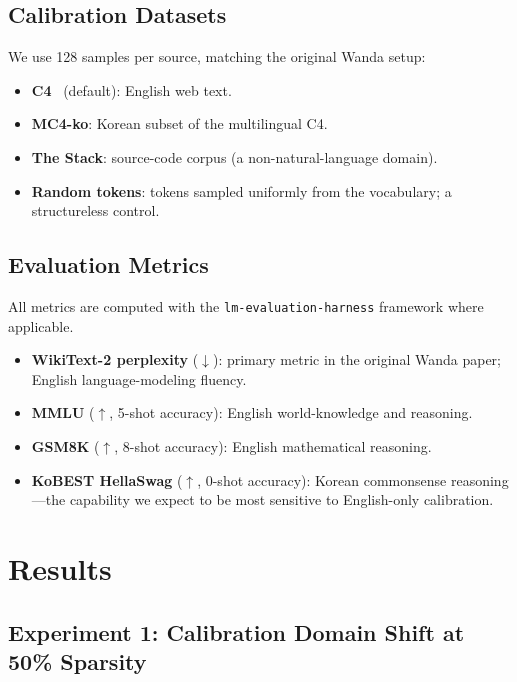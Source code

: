 \documentclass{article}
\begin{document}
\subsection{Calibration Datasets}

We use 128 samples per source, matching the original Wanda setup:
\begin{itemize}
  \item \textbf{C4}~\cite{c4} (default): English web text.
  \item \textbf{MC4-ko}: Korean subset of the multilingual C4.
  \item \textbf{The Stack}: source-code corpus (a non-natural-language domain).
  \item \textbf{Random tokens}: tokens sampled uniformly from the vocabulary;
        a structureless control.
\end{itemize}

\subsection{Evaluation Metrics}

All metrics are computed with the \texttt{lm-evaluation-harness} framework
where applicable.
\begin{itemize}
  \item \textbf{WikiText-2 perplexity} ($\downarrow$): primary metric in
        the original Wanda paper; English language-modeling fluency.
  \item \textbf{MMLU} ($\uparrow$, 5-shot accuracy): English world-knowledge
        and reasoning.
  \item \textbf{GSM8K} ($\uparrow$, 8-shot accuracy): English mathematical
        reasoning.
  \item \textbf{KoBEST HellaSwag} ($\uparrow$, 0-shot accuracy): Korean
        commonsense reasoning---the capability we expect to be most
        sensitive to English-only calibration.
\end{itemize}

\section{Results}

\subsection{Experiment 1: Calibration Domain Shift at 50\% Sparsity}
\label{sec:exp1}
\end{document}
